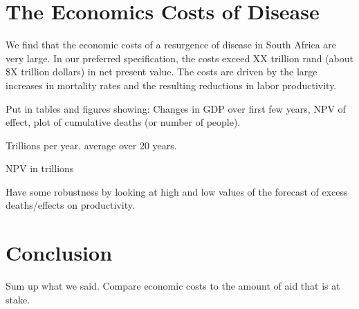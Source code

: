 \documentclass[letterpaper,12pt]{article}
\theoremstyle{definition}
\begin{document}
\begin{spacing}{1.5}
\section{The Economics Costs of Disease}\label{SecResults}

We find that the economic costs of a resurgence of disease in South Africa are very large.  In our preferred specification, the costs exceed XX trillion rand (about \$X trillion dollars) in net present value.  The costs are driven by the large increases in mortality rates and the resulting reductions in labor productivity.

Put in tables and figures showing: Changes in GDP over first few years, NPV of effect, plot of cumulative deaths (or number of people).

Trillions per year. average over 20 years.


NPV in trillions


Have some robustness by looking at high and low values of the forecast of excess deaths/effects on productivity.

\section{Conclusion}\label{SecConc}

Sum up what we said.  Compare economic costs to the amount of aid that is at stake.

\end{spacing}
\newpage

\end{document}
